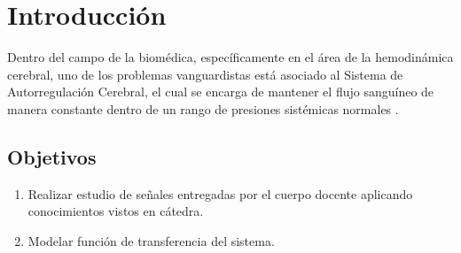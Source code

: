 \section{Introducción}

\par Dentro del campo de la biomédica, específicamente en el área de la hemodinámica cerebral, uno de los problemas vanguardistas está asociado al Sistema de Autorregulación Cerebral, el cual se encarga de mantener el flujo sanguíneo de manera constante dentro de un rango de presiones sistémicas normales \parencite{crespo2012hemo}. 

\subsection{Objetivos}
\begin{enumerate}
    \item Realizar estudio de señales entregadas por el cuerpo docente aplicando conocimientos vistos en cátedra.
    \item Modelar función de transferencia del sistema.
\end{enumerate}